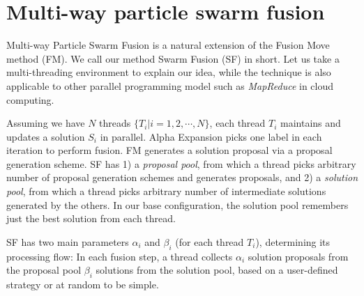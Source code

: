 \section{Multi-way particle swarm fusion}
Multi-way Particle Swarm Fusion is a natural extension of the Fusion
Move method (FM). We call our method Swarm Fusion (SF) in short. Let us
take a multi-threading environment to explain our idea, while the
technique is also applicable to other parallel programming model such as
{\it MapReduce} in cloud computing.
%

Assuming we have $N$ threads $\{T_i | i=1, 2, \cdots, N\}$, each thread
$T_i$ maintains and updates a solution $S_i$ in parallel. Alpha
Expansion picks one label in each iteration to perform fusion. FM
generates a solution proposal via a proposal generation scheme.
SF has 1) a {\it proposal pool}, from which a thread picks arbitrary
number of proposal generation schemes and generates proposals, and 2) a
{\it solution pool}, from which a thread picks arbitrary number of
intermediate solutions generated by the others.
%
%
In our base configuration, the solution pool remembers just the best
solution from each thread.

SF has two main parameters $\alpha_i$ and $\beta_i$ (for each thread
$T_i$), determining its processing flow: In each fusion step, a thread
collects $\alpha_i$ solution proposals from the proposal pool 
$\beta_i$ solutions from the solution pool, based on a user-defined
strategy or at random to be simple.
%


